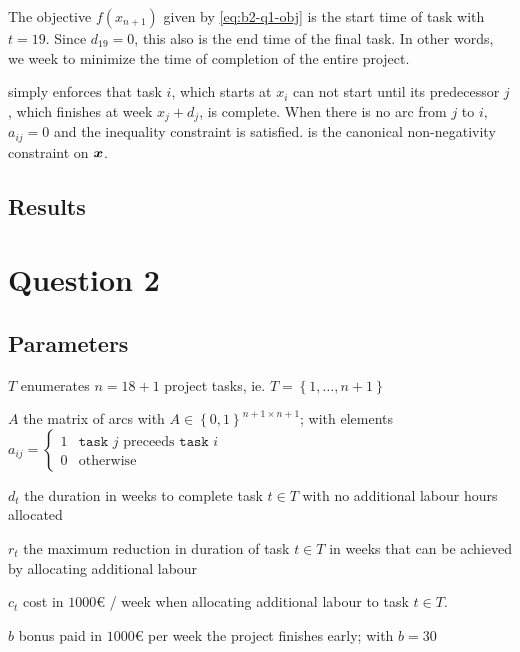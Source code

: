 The objective $f(x_{n+1})$ given by \cref{eq:b2-q1-obj} is the start time of task
with $t=19$. Since $d_{19}=0$, this also is the end time of the final task. In other
words, we week to minimize the time of completion of the entire project.

 simply enforces that task $i$, which starts at $x_i$ can not 
start until its predecessor $j$, which finishes at week $x_j+d_j$, is complete.
When there is no arc from $j$ to $i$, $a_{ij}=0$ and the inequality constraint is
satisfied.  is the canonical non-negativity constraint on $\boldsymbol{x}$.

\subsection{Results}\label{section:1.1.4}

\newpage

\section{Question 2}

\subsection{Parameters}

\begin{syms}
    \item[$T$] enumerates $n=18+1$ project tasks, ie. $T=\left\lbrace 1,\ldots,n+1\right\rbrace$

    \item[$A$] the matrix of arcs with $A\in\left\lbrace 0,1\right\rbrace^{n+1\times n+1}$;
    with elements $a_{ij}=\begin{cases}1 & \texttt{task } j \text{ preceeds }\texttt{task }i\\
    0 & \text{otherwise}\end{cases}$

    \item[$d_t$] the duration in weeks to complete task $t\in T$ with no additional labour hours allocated

    \item[$r_t$] the maximum reduction in duration of task $t\in T$ in weeks that can be 
        achieved by allocating additional labour

    \item[$c_t$] cost in $1000\euro{}$ / week when allocating additional labour
        to task $t\in T$.

    \item[$b$] bonus paid in $1000\euro{}$ per week the project finishes early; 
        with $b=30$

\end{syms}

